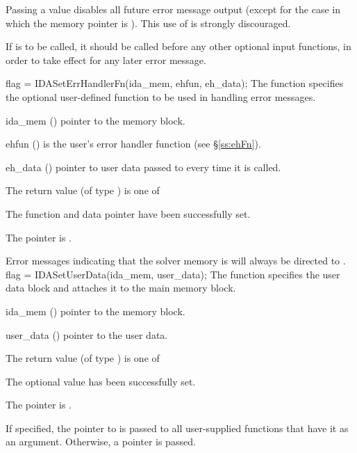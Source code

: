 {{  Passing a value  disables all future error message output
  (except for the case in which the {\ida} memory pointer is ).
  This use of  is strongly discouraged.

  {\warn}If  is to be called, it should be called before any
  other optional input functions, in order to take effect for any later error
  message.
}
{
flag = IDASetErrHandlerFn(ida\_mem, ehfun, eh\_data);
}
{
  The function  specifies the optional user-defined function
  to be used in handling error messages.
}
{
  \begin{args}
  \item[ida\_mem] ()
    pointer to the {\ida} memory block.
  \item[ehfun] ()
    is the user's {\CC} error handler function (see \S\ref{ss:ehFn}).
  \item[eh\_data] ()
    pointer to user data passed to  every time it is called.
  \end{args}
}
{
  The return value  (of type ) is one of
  \begin{args}
  \item[\Id{IDA\_SUCCESS}]
    The function  and data pointer  have been successfully set.
  \item[\Id{IDA\_MEM\_NULL}]
    The  pointer is .
  \end{args}
}
{
  Error messages indicating that the {\ida} solver memory is  will
  always be directed to .
}
{
  flag = IDASetUserData(ida\_mem, user\_data);
}
{
  The function  specifies the user data block 
  and attaches it to the main {\ida} memory block.
}
{
  \begin{args}
  \item[ida\_mem] ()
    pointer to the {\ida} memory block.
  \item[user\_data] ()
    pointer to the user data.
  \end{args}
}
{
  The return value  (of type ) is one of
  \begin{args}
  \item[\Id{IDA\_SUCCESS}]
    The optional value has been successfully set.
  \item[\Id{IDA\_MEM\_NULL}]
    The  pointer is .
  \end{args}
}
{
  If specified, the pointer to  is passed to all user-supplied
  functions that have it as an argument. Otherwise, a  pointer is passed.

}}
